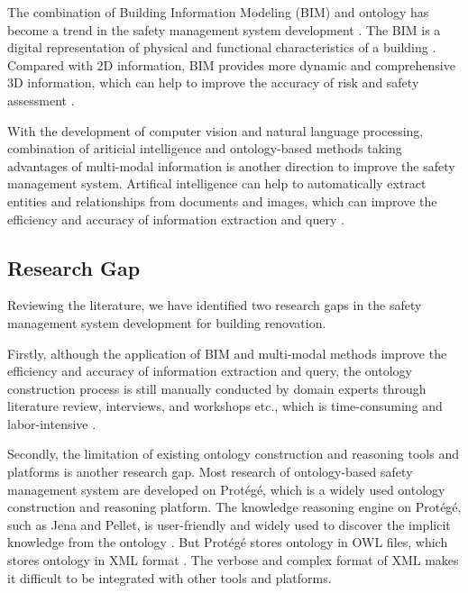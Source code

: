 The combination of Building Information Modeling (BIM) and ontology has become a trend in the safety management system development \cite[]{qi2023bim,zhou2023bim,shen2022safety}.
The BIM is a digital representation of physical and functional characteristics of a building \cite[]{qi2023bim}.
Compared with 2D information, BIM provides more dynamic and comprehensive 3D information, which can help to improve the accuracy of risk and safety assessment \cite[]{ding2016construction}. 

With the development of computer vision and natural language processing, 
combination of ariticial intelligence and ontology-based methods taking advantages of multi-modal information is another direction to improve the safety management system.
Artifical intelligence can help to automatically extract entities and relationships from documents and images, which can improve the efficiency and accuracy of information extraction and query \cite[]{zhong2020ontology,zhang2022automatic}.

\subsection*{Research Gap}
\label{sec:research_gap}
Reviewing the literature, we have identified two research gaps in the safety management system development for building renovation.

Firstly, although the application of BIM and multi-modal methods improve the efficiency and accuracy of information extraction and query, 
the ontology construction process is still manually conducted by domain experts through literature review, interviews, and workshops etc.,
which is time-consuming and labor-intensive \cite[]{doukari2024ontology,amorocho2021reno,shen2022safety,xing2019ontology,zhou2023bim}.

Secondly, the limitation of existing ontology construction and reasoning tools and platforms is another research gap.
Most research of ontology-based safety management system are developed on Protégé, which is a widely used ontology construction and reasoning platform. 
The knowledge reasoning engine on Protégé, such as Jena and Pellet, is user-friendly and widely used to discover the implicit knowledge from the ontology \cite[]{amorocho2021reno,doukari2024ontology,doukari2023bim}.   
But Protégé stores ontology in OWL files, which stores ontology in XML format \cite[]{mohan2011constructing}.  
The verbose and complex format of XML makes it difficult to be integrated with other tools and platforms.   

